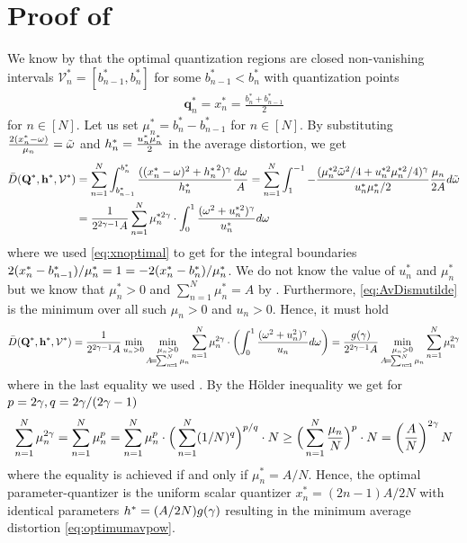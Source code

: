 \documentclass[12pt,onecolumn,journal,draftclsnofoot,letterpaper]{IEEEtran}
\renewcommand{\vp}{\mathbf q}
\renewcommand{\vP}{\mathbf Q}
\newcommand{\Vor}{\ensuremath{\mathcal{V}}}         %
\newcommand{\Dis}{\ensuremath{D}}                    %
\newcommand{\AvDis}{\ensuremath{\bar{\Dis}}}         %
\begin{document}
\section{Proof of }\label{sec:proof_theorem} 
  We know by  that the optimal quantization regions are closed non-vanishing
  intervals $\Vor_n^*=[b_{n-1}^*,b_n^*]$ for some $b^*_{n-1}<b_n^*$ with quantization points
  \begin{align}
   \vp_n^*= x_n^*=\frac{b^*_n+b^*_{n-1}}{2}\label{eq:xnoptimal}
  \end{align}
  for $n\in[N]$.
  Let us set $\mu_n^*=b_n^*-b_{n-1}^*$ for $n\in[N]$. By substituting $\frac{2(x_n^*-\omega)}{\mu_n}={  \tilde{\omega} }$ and
  $h^{*}_n=\frac{u^*_n \mu_n^*}{2}$  in the average distortion, we get 
  \begin{align}
    \AvDis(\vP^*,\vh^*,\Vor^*)&=\sum_{n=1}^N \int_{b_{n-1}^*}^{b_n^*} 
       \frac{ ((\pGlob_n-\ome)^2+{\hGlob_n}^2)^{\gam}}{\hGlob_n}\frac{d\ome}{A} 
       = \sum_{n=1}^N \int_{1}^{-1} -\frac{  (\mu_n^{*2} \tome^2/4 + u_n^{*2}\mu_n^{*2}/4)^{\gam}}{u_n^* \mu_n^*/2}
    \frac{\mu_n}{2A}d\tome\notag\\
    &= \frac{1}{ 2^{2\gam-1}A}\sum_{n=1}^N \mu_n^{*2\gam}\cdot\int_0^1 \frac{(\ome^2+u^{*2}_n)^{\gam}}{u^*_n}d
    \ome\label{eq:AvDismutilde} 
  \end{align}
  where we used \eqref{eq:xnoptimal} to get for the integral boundaries
  $2(x^{*}_n-b_{n-1}^*)/\mu_n^*=1=-2(x^{*}_n-b_{n}^*)/\mu^*_n$.  We do not know the value of $u^*_n$ and $\mu_n^*$ but
  we know that $\mu_n^*>0$ and $\sum_{n=1}^N\mu_n^*=A$ by . Furthermore, \eqref{eq:AvDismutilde} is
  the minimum over all such  $\mu_n>0$ and $u_n>0$. Hence, it must hold
  \begin{align}
    \AvDis(\vP^*,\vh^*,\Vor^*)
    = \frac{1}{2^{2\gam-1}A} \min_{u_n>0} \min_{\substack{\mu_n>0\\ A\!=\! \sum_{n\!=\!1}^N \mu_n}} 
    \sum_{n=1}^N \mu_n^{2\gam}\cdot\left(\int_0^1 
      \frac{(\ome^2+u^2_n)^{\gam}}{u_n}d \ome\right)
      = \frac{g(\gam)}{2^{2\gam-1}A}  
         \min_{\substack{\mu_n>0\\ A\!=\! \sum_{n\!=\!1}^N \mu_n}} \sum_{n=1}^N \mu_n^{2\gam}  \notag
  \end{align}
  where in the last equality we used . 
  By the Hölder inequality we get for $p=2\gamma, q=2\gamma/(2\gamma-1)$ 
  \begin{align}
    \sum_{n=1}^N \mu_n^{2\gamma}=\sum_{n=1}^N \mu_n^p  = \sum_{n=1}^N \mu_n^p \cdot\Big(\sum_{n=1}^N (1/N)^q \Big)^{p/q} \cdot N
    \geq\Big( \sum_{n=1}^N \frac{\mu_n }{N}\Big)^p \cdot N =
    \left(\frac{A}{N}\right)^{2\gamma}N\notag
  \end{align}
  where the equality is achieved if and only if $\mu_n^*=A/N$. Hence, the optimal parameter-quantizer is the 
  uniform scalar quantizer $x_n^*=(2n-1)A/2N$ with identical parameters $h^*=(A/2N)g(\gamma)$ resulting in the
  minimum average distortion \eqref{eq:optimumavpow}.
\end{document}
